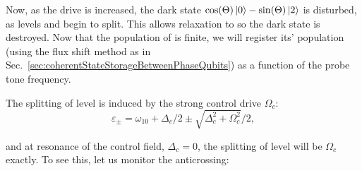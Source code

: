    \noindent Now, as the \lra{} drive is increased, the dark state $  \cos(\Theta)\Ket{0} - \sin(\Theta)\Ket{2} $ is disturbed, as levels  and  begin to split. This allows relaxation to  so the dark state is destroyed. Now that the population of  is finite, we will register its' population (using the flux shift method as in Sec.~\ref{sec:coherentStateStorageBetweenPhaseQubits}) as a function of the \ra{} probe tone frequency.
  
   
   The splitting of level  is induced by the strong control drive $ \Omega_c $:
   \[
   \varepsilon_{\pm} = \omega_{10} + \Delta_c/2 \pm \sqrt{\Delta_c^2+\Omega_c^2}/2,
   \]
   
   \noindent and at resonance of the control field, $ \Delta_c = 0 $, the splitting of level  will be $ \Omega_c $ exactly. To see this, let us monitor the anticrossing:
   
   
   
 \newpage
